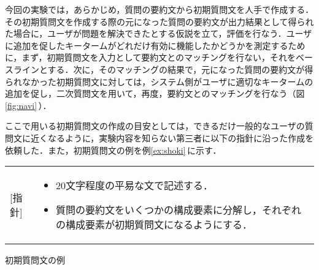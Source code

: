 今回の実験では，あらかじめ，質問の要約文から初期質問文を人手で作成する．その初期質問文を作成する際の元になった質問の要約文が出力結果として得られた場合に，ユーザが問題を解決できたとする仮説を立て，評価を行なう．ユーザに追加を促したキータームがどれだけ有効に機能したかどうかを測定するために，まず，初期質問文を入力として要約文とのマッチングを行ない，それをベースラインとする．次に，そのマッチングの結果で，元になった質問の要約文が得られなかった初期質問文に対しては，システム側がユーザに適切なキータームの追加を促し，二次質問文を用いて，再度，要約文とのマッチングを行なう（図\ref{fig:navi}\,）． 


ここで用いる初期質問文の作成の目安としては，できるだけ一般的なユーザの質問文に近くなるように，実験内容を知らない第三者に以下の指針に沿った作成を依頼した．また，初期質問文の例を例\ref{ex:shoki}\,に示す．


\begin{example}[hb]
\begin{center}
\begin{tabular}{ll}
 [指針] & \begin{minipage}[t]{0.85\textwidth}
	   \begin{itemize}
	   \item 20文字程度の平易な文で記述する．
	   \item 質問の要約文をいくつかの構成要素に分解し，それぞれの構成要素が初期質問文になるようにする．
	  \end{itemize}
	  \end{minipage}\\
\end{tabular}

\vspace{0.8em}
  \end{center}
 \caption{初期質問文の例}
 \label{ex:shoki}
\end{example}

